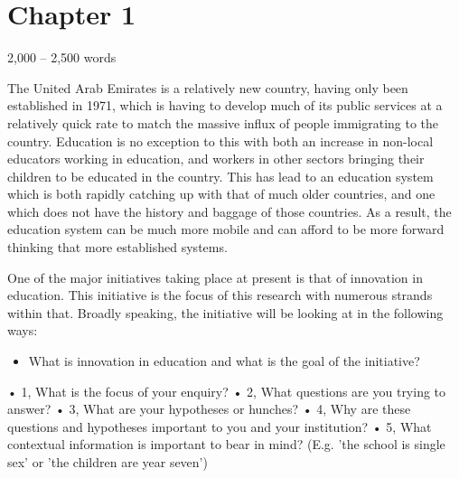 \section{Chapter 1}
2,000 – 2,500 words\citep{Frame61:online}

The United Arab Emirates is a relatively new country, having only been established in 1971, which is having to develop much of its public services at a relatively quick rate to match the massive influx of people immigrating to the country. Education is no exception to this with both an increase in non-local educators working in education, and workers in other sectors bringing their children to be educated in the country. This has lead to an education system which is both rapidly catching up with that of much older countries, and one which does not have the history and baggage of those countries. As a result, the education system can be much more mobile and can afford to be more forward thinking that more established systems. 

One of the major initiatives taking place at present is that of innovation in education. This initiative is the focus of this research with numerous strands within that. Broadly speaking, the initiative will be looking at in the following ways: 

\begin{itemize}
\item What is innovation in education and what is the goal of the initiative?

\end{itemize}

•	1, What is the focus of your enquiry?
•	2, What questions are you trying to answer?
•	3, What are your hypotheses or hunches?
•	4, Why are these questions and hypotheses important to you and your institution?
•	5, What contextual information is important to bear in mind? (E.g. 'the school is single sex' or 'the children are year seven')
